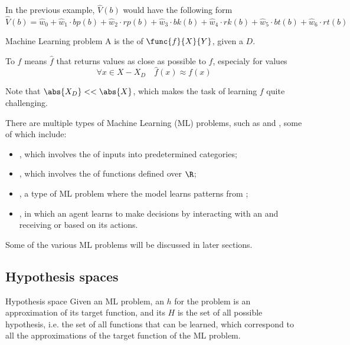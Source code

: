 \documentclass[a4paper, 12pt]{report}
\begin{document}
    In the previous example, $\hat V(b)$ would have the following form $$\hat V(b) = \hat w_0 + \hat w_1 \cdot bp(b) + \hat w_2 \cdot rp(b) + \hat w_3 \cdot bk(b) + \hat w_4 \cdot rk(b) + \hat w_5 \cdot bt(b) + \hat w_6 \cdot rt(b)$$

    \begin{frameddefn}{Machine Learning problem}
        A  is the  of  $\func{f}{X}{Y}$, given a  $D$.

        To  $f$ means  $\hat f$ that returns values as close as possible to $f$, especialy for values  $$\forall x \in  X - X_D \quad \hat f(x) \approx f(x)$$
    \end{frameddefn}

    Note that $\abs{X_D} << \abs{X}$, which makes the task of learning $f$ quite challenging.

    There are multiple types of Machine Learning (ML) problems, such as  and , some of which include:

    \begin{itemize}
        \item {}, which involves the  of inputs into predetermined categories;
        \item {}, which involves the  of functions defined over $\R$;
        \item {}, a type of ML problem where the model learns patterns from ;
        \item {}, in which an agent learns to make decisions by interacting with an  and receiving  or  based on its actions.
    \end{itemize}

    Some of the various ML problems will be discussed in later sections.

    \subsection{Hypothesis spaces}
    
    \begin{frameddefn}{Hypothesis space}
        Given an ML problem, an  $h$ for the problem is an approximation of its target function, and its  $H$ is the set of all possible hypothesis, i.e. the set of all functions that can be learned, which correspond to all the approximations of the target function of the ML problem.
    \end{frameddefn}
\end{document}
